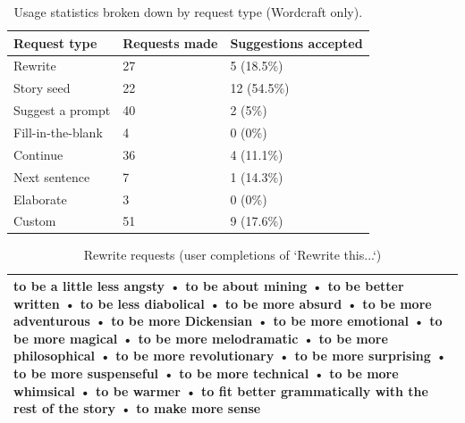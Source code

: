 \begin{table}
  \caption{Usage statistics broken down by request type (Wordcraft only).}
  \small
  \label{tab:freq_wc}
  \begin{tabular}{lll}
    \toprule
    Request type&Requests made&Suggestions accepted\\
    \midrule
    Rewrite&27&5 (18.5\%)\\
    Story seed&22&12 (54.5\%)\\
    Suggest a prompt&40&2 (5\%)\\
    Fill-in-the-blank&4&0 (0\%)\\
    Continue&36&4 (11.1\%)\\
    Next sentence&7&1 (14.3\%)\\
    Elaborate&3&0 (0\%)\\
    Custom&51&9 (17.6\%)\\
  \bottomrule
\end{tabular}
\end{table}

\begin{table}
\caption{Rewrite requests (user completions of `Rewrite this...`)}
\label{tab:rewrites}
\small
\begin{tabular}{p{}}
\toprule
to be a little less angsty • to be about mining • to be better written • to be less diabolical • to be more absurd • to be more adventurous • to be more Dickensian • to be more emotional • to be more magical • to be more melodramatic • to be more philosophical • to be more revolutionary • to be more surprising • to be more suspenseful • to be more technical • to be more whimsical • to be warmer • to fit better grammatically with the rest of the story • to make more sense \\
\bottomrule
\end{tabular}
\end{table}

